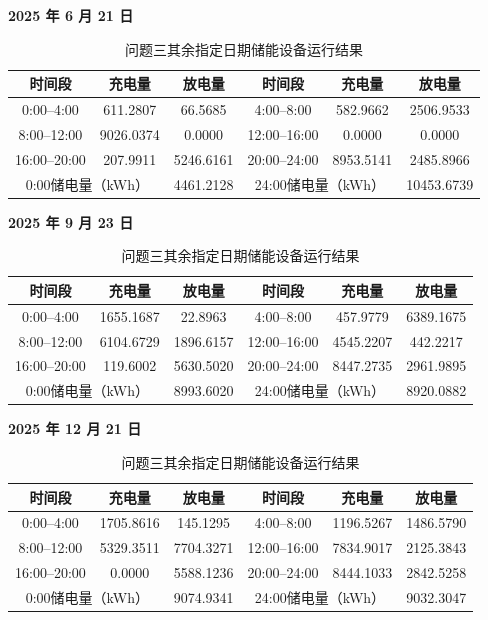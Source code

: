 \documentclass[12pt,a4paper]{ctexart}
\renewcommand{\textbf}[1]{{\CJKfamily{heiti}\bfseries #1}}
\begin{document}
\begin{table}[H]
\centering
\caption{问题三其余指定日期储能设备运行结果}
\label{tab:q3-storage-appendix}
\footnotesize
\renewcommand{\arraystretch}{1.15}
\textbf{2025 年 6 月 21 日}\par\vspace{0.2em}
\begin{tabular}{|c|c|c|c|c|c|}
\hline
时间段 & 充电量 & 放电量 & 时间段 & 充电量 & 放电量 \\
\hline
0:00--4:00 & 611.2807 & 66.5685 & 4:00--8:00 & 582.9662 & 2506.9533 \\
\hline
8:00--12:00 & 9026.0374 & 0.0000 & 12:00--16:00 & 0.0000 & 0.0000 \\
\hline
16:00--20:00 & 207.9911 & 5246.6161 & 20:00--24:00 & 8953.5141 & 2485.8966 \\
\hline
\multicolumn{2}{|c|}{0:00储电量（kWh）} & 4461.2128 &
\multicolumn{2}{c|}{24:00储电量（kWh）} & 10453.6739 \\
\hline
\end{tabular}

\vspace{0.7em}
\textbf{2025 年 9 月 23 日}\par\vspace{0.2em}
\begin{tabular}{|c|c|c|c|c|c|}
\hline
时间段 & 充电量 & 放电量 & 时间段 & 充电量 & 放电量 \\
\hline
0:00--4:00 & 1655.1687 & 22.8963 & 4:00--8:00 & 457.9779 & 6389.1675 \\
\hline
8:00--12:00 & 6104.6729 & 1896.6157 & 12:00--16:00 & 4545.2207 & 442.2217 \\
\hline
16:00--20:00 & 119.6002 & 5630.5020 & 20:00--24:00 & 8447.2735 & 2961.9895 \\
\hline
\multicolumn{2}{|c|}{0:00储电量（kWh）} & 8993.6020 &
\multicolumn{2}{c|}{24:00储电量（kWh）} & 8920.0882 \\
\hline
\end{tabular}

\vspace{0.7em}
\textbf{2025 年 12 月 21 日}\par\vspace{0.2em}
\begin{tabular}{|c|c|c|c|c|c|}
\hline
时间段 & 充电量 & 放电量 & 时间段 & 充电量 & 放电量 \\
\hline
0:00--4:00 & 1705.8616 & 145.1295 & 4:00--8:00 & 1196.5267 & 1486.5790 \\
\hline
8:00--12:00 & 5329.3511 & 7704.3271 & 12:00--16:00 & 7834.9017 & 2125.3843 \\
\hline
16:00--20:00 & 0.0000 & 5588.1236 & 20:00--24:00 & 8444.1033 & 2842.5258 \\
\hline
\multicolumn{2}{|c|}{0:00储电量（kWh）} & 9074.9341 &
\multicolumn{2}{c|}{24:00储电量（kWh）} & 9032.3047 \\
\hline
\end{tabular}
\end{table}
\end{document}
